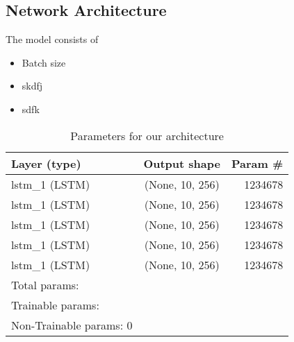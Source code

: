 \subsection{Network Architecture}

The model consists of

\begin{itemize}
    \item Batch size 
    \item skdfj
    \item sdfk
\end{itemize}

\begin{table}[h]
    \centering
    \begin{tabular}{ l c r }
      \hline
      Layer (type) & Output shape & Param \# \\ \hline
      lstm\_1 (LSTM) & (None, 10, 256) & 1234678 \\ \hline
      lstm\_1 (LSTM) & (None, 10, 256) & 1234678 \\ \hline
      lstm\_1 (LSTM) & (None, 10, 256) & 1234678 \\ \hline
      lstm\_1 (LSTM) & (None, 10, 256) & 1234678 \\ \hline
      lstm\_1 (LSTM) & (None, 10, 256) & 1234678 \\ \hline
      Total params: & & \\
      Trainable params: & & \\ 
      Non-Trainable params: 0 & & \\ \hline
      
    \end{tabular}
    \caption{Parameters for our architecture}
    \label{tab:archparams}
\end{table}
